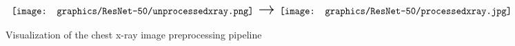 \begin{figure}[h]
    \centering
    $
    \begin{array}{l}
    \texttt{[image: graphics/ResNet-50/unprocessedxray.png]}
    \end{array}
    \mathlarger{\mathlarger{\mathlarger{\mathlarger{\rightarrow}}}}
    \begin{array}{l}
        \texttt{[image: graphics/ResNet-50/processedxray.jpg]}
    \end{array}
    $
    \caption{Visualization of the chest x-ray image preprocessing pipeline}
\end{figure}